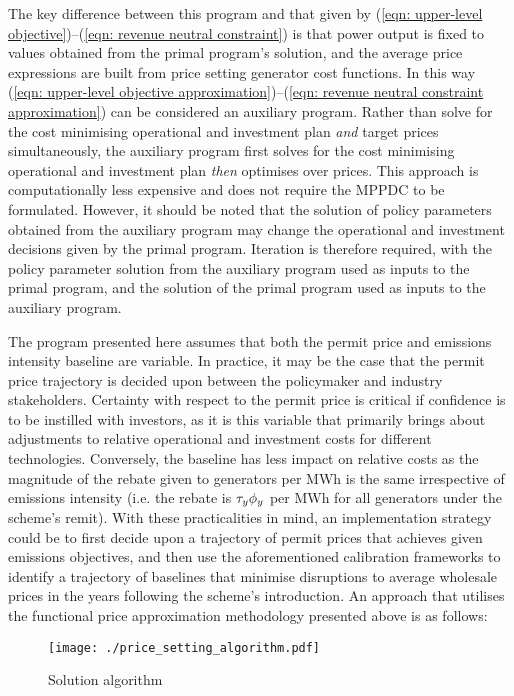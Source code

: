 \documentclass{article}
\begin{document}
The key difference between this program and that given by (\ref{eqn: upper-level objective})--(\ref{eqn: revenue neutral constraint}) is that power output is fixed to values obtained from the primal program's solution, and the average price expressions are built from price setting generator cost functions. In this way (\ref{eqn: upper-level objective approximation})--(\ref{eqn: revenue neutral constraint approximation}) can be considered an auxiliary program. Rather than solve for the cost minimising operational and investment plan \textit{and} target prices simultaneously, the auxiliary program first solves for the cost minimising operational and investment plan \textit{then} optimises over prices. This approach is computationally less expensive and does not require the MPPDC to be formulated. However, it should be noted that the solution of policy parameters obtained from the auxiliary program may change the operational and investment decisions given by the primal program. Iteration is therefore required, with the policy parameter solution from the auxiliary program used as inputs to the primal program, and the solution of the primal program used as inputs to the auxiliary program.

The program presented here assumes that both the permit price and emissions intensity baseline are variable. In practice, it may be the case that the permit price trajectory is decided upon between the policymaker and industry stakeholders. Certainty with respect to the permit price is critical if confidence is to be instilled with investors, as it is this variable that primarily brings about adjustments to relative operational and investment costs for different technologies. Conversely, the baseline has less impact on relative costs as the magnitude of the rebate given to generators per MWh is the same irrespective of emissions intensity (i.e. the rebate  is $\tau_{y}\phi_{y}$ per MWh for all generators under the scheme's remit). With these practicalities in mind, an implementation strategy could be to first decide upon a trajectory of permit prices that achieves given emissions objectives, and then use the aforementioned calibration frameworks to identify a trajectory of baselines that minimise disruptions to average wholesale prices in the years following the scheme's introduction. An approach that utilises the functional price approximation methodology presented above is as follows:

\begin{figure}
	\centering
	\texttt{[image: ./price\_setting\_algorithm.pdf]}
	\caption{Solution algorithm}
\end{figure}
\end{document}
